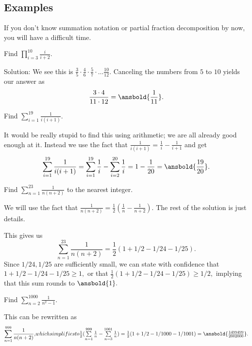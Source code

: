 \documentclass[blue,onecol]{shooting}
\begin{document}
\subsection{Examples}
If you don't know summation notation or partial fraction decomposition by now, you will have a difficult time.

\begin{exam}
Find $\prod\limits_{i=3}^{10}\frac{i}{i+2}.$
\end{exam}

\begin{sol}
Solution: We see this is $\frac{3}{5}\cdot \frac{4}{6}\cdot \frac{5}{7}\cdot \dots \frac{10}{12}.$ Canceling the numbers from $5$ to $10$ yields our answer as \[\frac{3\cdot 4}{11\cdot 12}=\ansbold{\frac{1}{11}}.\]
\end{sol}

\begin{exam}
Find $\sum\limits_{i=1}^{19} \frac{1}{i(i+1)}.$
\end{exam}

\begin{sol}
It would be really stupid to find this using arithmetic; we are all already good enough at it. Instead we use the fact that $\frac{1}{i(i+1)}=\frac{1}{i}-\frac{1}{i+1}$ and get \[\sum\limits_{i=1}^{19} \frac{1}{i(i+1)}=\sum\limits_{i=1}^{19} \frac{1}{i}-\sum\limits_{i=2}^{20}\frac{1}{i}=1-\frac{1}{20}=\ansbold{\frac{19}{20}}.\]
\end{sol}

\begin{exam}
Find $\sum\limits_{n=1}^{23} \frac{1}{n(n+2)}$ to the nearest integer.
\end{exam}

\begin{sol}
We will use the fact that $\frac{1}{n(n+2)}=\frac{1}{2}(\frac{1}{n}-\frac{1}{n+2}).$ The rest of the solution is just details.

This gives us \[\sum\limits_{n=1}^{23} \frac{1}{n(n+2)}=\frac{1}{2}(1+1/2-1/24-1/25).\] Since $1/24,1/25$ are sufficiently small, we can state with confidence that $1+1/2-1/24-1/25\geq 1,$ or that $\frac{1}{2}(1+1/2-1/24-1/25) \geq 1/2,$ implying that this sum rounds to $\ansbold{1}.$
\end{sol}

\begin{exam}
Find $\sum\limits_{n=2}^{1000} \frac{1}{n^2-1}.$
\end{exam}

\begin{sol}
This can be rewritten as \[\sum\limits_{n=1}^{999}\frac{1}{n(n+2)},$$ which simplifies to $$\frac{1}{2}(\sum\limits_{n=1}^{999}\frac{1}{n}-\sum\limits_{n=3}^{1001}\frac{1}{n})=\frac{1}{2}(1+1/2-1/1000-1/1001)=\ansbold{\frac{1499499}{2002000}}.\]
\end{sol}
\end{document}
